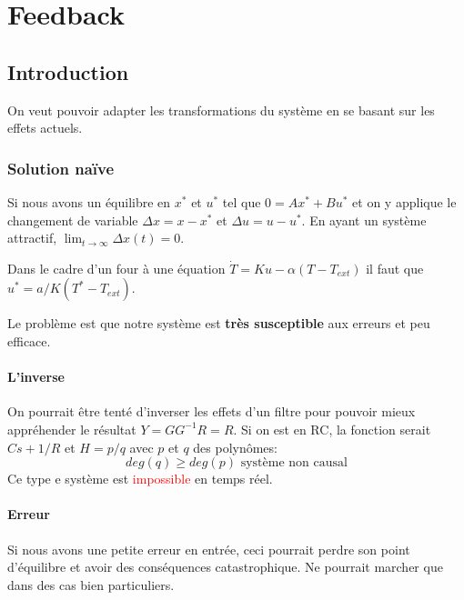 \documentclass{report}
\begin{document}
\chapter{Feedback}
\section{Introduction}
On veut pouvoir adapter les transformations du système en se basant sur les effets actuels.

\subsection{Solution naïve}
Si nous avons un équilibre en $x^*$ et $u^*$ tel que $0 = Ax^* + Bu^*$ et on y applique le changement de variable $\Delta x = x - x^*$ et $\Delta u = u - u^*$. En ayant un système attractif, $\lim_{t \rightarrow \infty} \Delta x (t) = 0$.\par
Dans le cadre d'un four à une équation $\dot{T} = Ku -\alpha (T-T_{ext})$ il faut que $u^* = a/K (T^* - T_{ext})$.\par 
Le problème est que notre système est \textbf{très susceptible} aux erreurs et peu efficace.

\subsubsection{L'inverse}
On pourrait être tenté d'inverser les effets d'un filtre pour pouvoir mieux appréhender le résultat $Y = GG^{-1}R = R$. Si on est en RC, la fonction serait $Cs + 1/R$ et $H = p/q$ avec $p$ et $q$ des polynômes:
\begin{equation}
deg(q) \geqslant deg(p) \text{ système non causal}
\end{equation}
Ce type e système est \textcolor{red}{impossible} en temps réel.\par 

\subsubsection{Erreur}
Si nous avons une petite erreur en entrée, ceci pourrait perdre son point d'équilibre et avoir des conséquences catastrophique. Ne pourrait marcher que dans des cas bien particuliers. 
\end{document}

